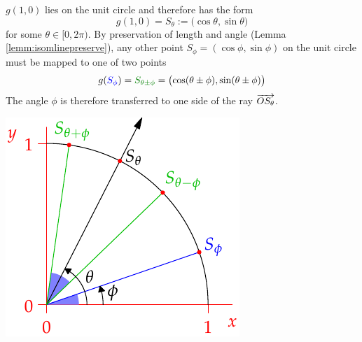 \begin{enumerate}
\begin{minipage}[t]{0.31\linewidth}
	\end{minipage}
	\bigbreak
	\begin{minipage}[t]{0.64\linewidth}\vspace{0pt}
		\item $g(1,0)$ lies on the unit circle and therefore has the form
		\[
			g(1,0)=S_\theta:=\bigl(\cos\theta,\sin\theta\bigr)
		\]
		for some $\theta\in[0,2\pi)$. By preservation of length and angle (Lemma \ref{lemm:isomlinepreserve}), any other point $S_\phi=(\cos\phi,\sin\phi)$ on the unit circle must be mapped to one of two points
		\[
			g(\textcolor{blue}{S_\phi})=\textcolor{Green}{S_{\theta\pm\phi}} =\bigl(\cos(\theta\pm\phi),\sin(\theta\pm\phi)\bigr)
		\]
		The angle $\phi$ is therefore transferred to one side of the ray $\overrightarrow{OS_\theta}$.
	\end{minipage}
	\hfill
	\begin{minipage}[t]{0.34\linewidth}\vspace{0pt}
		\flushright\includegraphics[scale=0.95]{isom-rot2}
	\end{minipage}
\end{enumerate}

